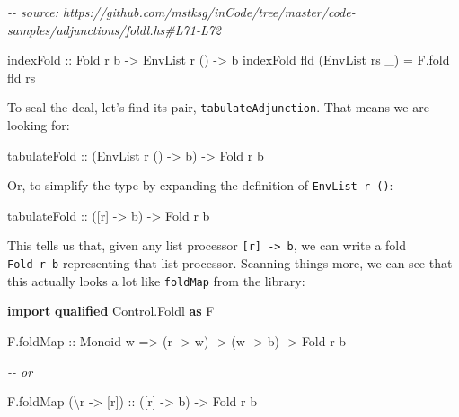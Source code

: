 \documentclass[]{article}
\newenvironment{Shaded}{}{}
\newcommand{\CommentTok}[1]{\textcolor[rgb]{0.38,0.63,0.69}{\textit{#1}}}
\newcommand{\DataTypeTok}[1]{\textcolor[rgb]{0.56,0.13,0.00}{#1}}
\newcommand{\KeywordTok}[1]{\textcolor[rgb]{0.00,0.44,0.13}{\textbf{#1}}}
\newcommand{\NormalTok}[1]{#1}
\newcommand{\OtherTok}[1]{\textcolor[rgb]{0.00,0.44,0.13}{#1}}
\begin{document}
\begin{Shaded}
\begin{Highlighting}[]
\CommentTok{{-}{-} source: https://github.com/mstksg/inCode/tree/master/code{-}samples/adjunctions/foldl.hs\#L71{-}L72}

\OtherTok{indexFold ::} \DataTypeTok{Fold}\NormalTok{ r b }\OtherTok{{-}>} \DataTypeTok{EnvList}\NormalTok{ r () }\OtherTok{{-}>}\NormalTok{ b}
\NormalTok{indexFold fld (}\DataTypeTok{EnvList}\NormalTok{ rs \_) }\OtherTok{=}\NormalTok{ F.fold fld rs}
\end{Highlighting}
\end{Shaded}

To seal the deal, let's find its pair, \texttt{tabulateAdjunction}. That means
we are looking for:

\begin{Shaded}
\begin{Highlighting}[]
\OtherTok{tabulateFold ::}\NormalTok{ (}\DataTypeTok{EnvList}\NormalTok{ r () }\OtherTok{{-}>}\NormalTok{ b) }\OtherTok{{-}>} \DataTypeTok{Fold}\NormalTok{ r b}
\end{Highlighting}
\end{Shaded}

Or, to simplify the type by expanding the definition of \texttt{EnvList\ r\ ()}:

\begin{Shaded}
\begin{Highlighting}[]
\OtherTok{tabulateFold ::}\NormalTok{ ([r] }\OtherTok{{-}>}\NormalTok{ b) }\OtherTok{{-}>} \DataTypeTok{Fold}\NormalTok{ r b}
\end{Highlighting}
\end{Shaded}

This tells us that, given any list processor
\texttt{{[}r{]}\ -\textgreater{}\ b}, we can write a fold \texttt{Fold\ r\ b}
representing that list processor. Scanning things more, we can see that this
actually looks a lot like \texttt{foldMap} from the library:

\begin{Shaded}
\begin{Highlighting}[]
\KeywordTok{import} \KeywordTok{qualified} \DataTypeTok{Control.Foldl} \KeywordTok{as} \DataTypeTok{F}

\NormalTok{F.foldMap}
\OtherTok{    ::} \DataTypeTok{Monoid}\NormalTok{ w}
    \OtherTok{=>}\NormalTok{ (r }\OtherTok{{-}>}\NormalTok{ w)}
    \OtherTok{{-}>}\NormalTok{ (w }\OtherTok{{-}>}\NormalTok{ b)}
    \OtherTok{{-}>} \DataTypeTok{Fold}\NormalTok{ r b}

\CommentTok{{-}{-} or}

\NormalTok{F.foldMap (\textbackslash{}r }\OtherTok{{-}>}\NormalTok{ [r])}
\OtherTok{    ::}\NormalTok{ ([r] }\OtherTok{{-}>}\NormalTok{ b)}
    \OtherTok{{-}>} \DataTypeTok{Fold}\NormalTok{ r b}
\end{Highlighting}
\end{Shaded}
\end{document}
